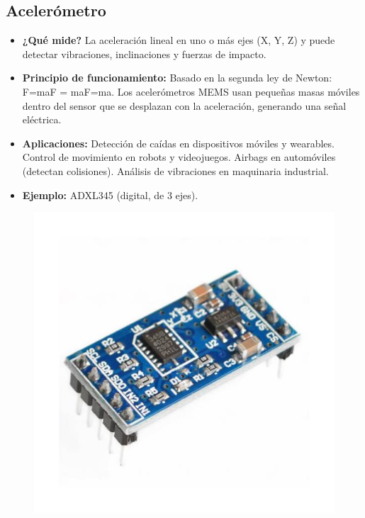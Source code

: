\subsection*{Acelerómetro}
\begin{itemize}
	\item \textbf{¿Qué mide?} La aceleración lineal en uno o más ejes (X, Y, Z) y puede detectar vibraciones, inclinaciones y fuerzas de impacto.
	\item \textbf{Principio de funcionamiento:} Basado en la segunda ley de Newton: F=maF = maF=ma.
	Los acelerómetros MEMS usan pequeñas masas móviles dentro del sensor que se desplazan con la aceleración, generando una señal eléctrica.
	\item \textbf{Aplicaciones:} Detección de caídas en dispositivos móviles y wearables.
	Control de movimiento en robots y videojuegos.
	Airbags en automóviles (detectan colisiones).
	Análisis de vibraciones en maquinaria industrial.
	\item \textbf{Ejemplo:} ADXL345 (digital, de 3 ejes).
\end{itemize}
\begin{figure}[h]
	\centering
	\includegraphics[width=0.3\linewidth]{img/acelerometro}
	\label{fig:acelerometro}
\end{figure}
